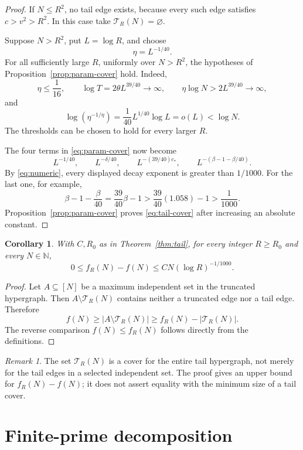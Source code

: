 \documentclass[11pt]{article}
\newtheorem{corollary}[theorem]{Corollary}
\theoremstyle{definition}
\theoremstyle{remark}
\newtheorem{remark}[theorem]{Remark}
\numberwithin{equation}{section}
\newcommand{\N}{\mathbb N}
\begin{document}
\begin{proof}
If \(N\le R^2\), no tail edge exists, because every such edge
satisfies \(c>v^2>R^2\). In this case take
\(\mathcal T_R(N)=\varnothing\).

Suppose \(N>R^2\), put \(L=\log R\), and choose
\[
 \eta=L^{-1/40}.
\]
For all sufficiently large \(R\), uniformly over
\(N>R^2\), the hypotheses of Proposition~\ref{prop:param-cover}
hold. Indeed,
\[
 \eta\le\frac1{16},\qquad
 \log T=2\theta L^{39/40}\longrightarrow\infty,
 \qquad
 \eta\log N>2L^{39/40}\longrightarrow\infty,
\]
and
\[
 \log(\eta^{-1/\eta})
 =\frac1{40}L^{1/40}\log L=o(L)<\log N.
\]
The thresholds can be chosen to hold for every larger \(R\).

The four terms in \eqref{eq:param-cover} now become
\[
 L^{-1/40},\qquad
 L^{-\delta/40},\qquad
 L^{-(39/40)c_*},\qquad
 L^{-(\beta-1-\beta/40)}.
\]
By \eqref{eq:numeric}, every displayed decay exponent is greater
than \(1/1000\). For the last one, for example,
\[
 \beta-1-\frac{\beta}{40}
 =\frac{39}{40}\beta-1
 >\frac{39}{40}(1.058)-1
 >\frac1{1000}.
\]
Proposition~\ref{prop:param-cover} proves
\eqref{eq:tail-cover} after increasing an absolute constant.
\end{proof}

\begin{corollary}\label{cor:extremal-comparison}
With \(C,R_0\) as in Theorem~\ref{thm:tail}, for every integer
\(R\ge R_0\) and every \(N\in\N\),
\[
 0\le f_R(N)-f(N)\le CN(\log R)^{-1/1000}.
\]
\end{corollary}

\begin{proof}
Let \(A\subseteq[N]\) be a maximum independent set in the
truncated hypergraph. Then \(A\setminus\mathcal T_R(N)\) contains
neither a truncated edge nor a tail edge. Therefore
\[
 f(N)\ge |A\setminus\mathcal T_R(N)|
 \ge f_R(N)-|\mathcal T_R(N)|.
\]
The reverse comparison \(f(N)\le f_R(N)\) follows directly from
the definitions.
\end{proof}

\begin{remark}
The set \(\mathcal T_R(N)\) is a cover for the entire tail
hypergraph, not merely for the tail edges in a selected
independent set. The proof gives an upper bound for
\(f_R(N)-f(N)\); it does not assert equality with the minimum
size of a tail cover.
\end{remark}

\section{Finite-prime decomposition}
\end{document}
